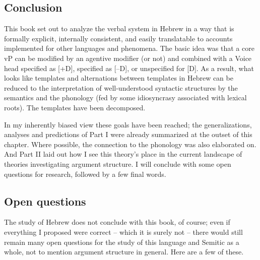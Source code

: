 \begin{exe}
\begin{xlist}
\begin{xlist}
\begin{xlist}
\begin{xlist}
\begin{xlist}
\begin{xlist}
\begin{exe}
\begin{xlist}
\begin{exe}
\begin{exe}
\begin{xlist}
\begin{exe}
\begin{exe}
\begin{xlist}
\begin{exe}
\begin{xlist}
\begin{exe}
\begin{xlist}
\begin{exe}
\begin{xlist}
\begin{exe}
\begin{xlist}
\begin{exe}
\begin{xlist}
\begin{exe}
\begin{xlist}
\begin{exe}
\begin{xlist}
\begin{exe}
\begin{xlist}
\begin{exe}
\begin{xlist}
\begin{exe}
\begin{xlist}
\section{Conclusion} \label{i:conc}
This book set out to analyze the verbal system in Hebrew in a way that is formally explicit, internally consistent, and easily translatable to accounts implemented for other languages and phenomena. The basic idea was that a core vP can be modified by an agentive modifier (or not) and combined with a Voice head specified as [\!+\!D], specified as [--D], or unspecified for [D]. As a result, what looks like templates and alternations between templates in Hebrew can be reduced to the interpretation of well-understood syntactic structures by the semantics and the phonology (fed by some idiosyncrasy associated with lexical roots). The templates have been decomposed.

In my inherently biased view these goals have been reached; the generalizations, analyses and predictions of Part I were already summarized at the outset of this chapter. Where possible, the connection to the phonology was also elaborated on. And Part II laid out how I see this theory's place in the current landscape of theories investigating argument structure. I will conclude with some open questions for research, followed by a few final words.

	\subsection{Open questions}
The study of Hebrew does not conclude with this book, of course; even if everything I proposed were correct -- which it is surely not -- there would still remain many open questions for the study of this language and Semitic as a whole, not to mention argument structure in general. Here are a few of these.


\end{xlist}
\end{exe}
\end{xlist}
\end{exe}
\end{xlist}
\end{exe}
\end{xlist}
\end{exe}
\end{xlist}
\end{exe}
\end{xlist}
\end{exe}
\end{xlist}
\end{exe}
\end{xlist}
\end{exe}
\end{xlist}
\end{exe}
\end{xlist}
\end{exe}
\end{xlist}
\end{exe}
\end{exe}
\end{xlist}
\end{exe}
\end{exe}
\end{xlist}
\end{exe}
\end{xlist}
\end{xlist}
\end{xlist}
\end{xlist}
\end{xlist}
\end{xlist}
\end{exe}
